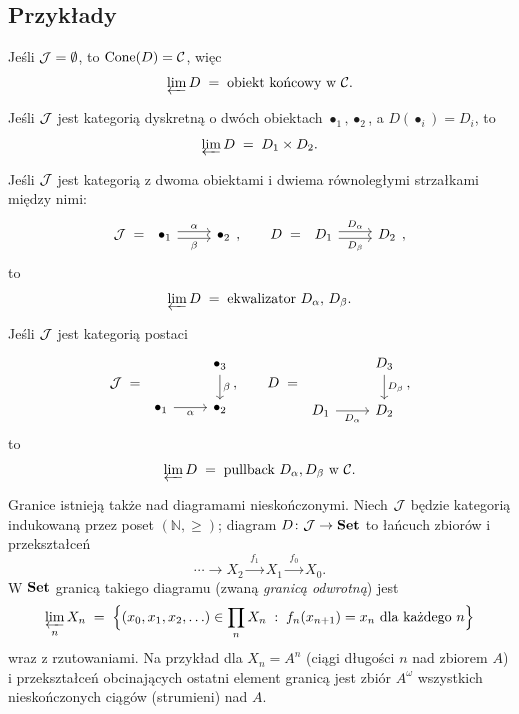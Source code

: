 \subsection*{Przykłady}

\begin{przyklad}
Jeśli $\mathcal{J} = \emptyset$, to $\mathrm{Cone}(D) = \mathcal{C}$, więc
\[
\varprojlim D \;=\; \text{obiekt końcowy w } \mathcal{C}.
\]
\end{przyklad}

\begin{przyklad}
Jeśli $\mathcal{J}$ jest kategorią dyskretną o dwóch obiektach $\bullet_1, \bullet_2$, a $D(\bullet_i) = D_i$, to
\[
\varprojlim D \;=\; D_1 \times D_2.
\]
\end{przyklad}

\begin{przyklad}
Jeśli $\mathcal{J}$ jest kategorią z dwoma obiektami i dwiema równoległymi strzałkami między nimi:
\[
\Jcat \;=\; \begin{tikzcd} \bullet_1 \arrow[r, shift left, "\alpha"] \arrow[r, shift right, "\beta"'] & \bullet_2 \end{tikzcd},
\qquad
D \;=\; \begin{tikzcd} D_1 \arrow[r, shift left, "D_\alpha"] \arrow[r, shift right, "D_\beta"'] & D_2 \end{tikzcd},
\]
to
\[
\varprojlim D \;=\; \text{ekwalizator } D_\alpha,\, D_\beta.
\]
\end{przyklad}

\begin{przyklad}
Jeśli $\mathcal{J}$ jest kategorią postaci
\[
\Jcat \;=\; \begin{tikzcd} & \bullet_3 \arrow[d, "\beta"] \\ \bullet_1 \arrow[r, "\alpha"'] & \bullet_2 \end{tikzcd},
\qquad
D \;=\; \begin{tikzcd} & D_3 \arrow[d, "D_\beta"] \\ D_1 \arrow[r, "D_\alpha"'] & D_2 \end{tikzcd},
\]
to
\[
\varprojlim D \;=\; \text{pullback } D_\alpha, D_\beta \text{ w } \mathcal{C}.
\]
\end{przyklad}

\begin{przyklad}
Granice istnieją także nad diagramami nieskończonymi. Niech $\mathcal{J}$ będzie kategorią indukowaną przez poset $(\mathbb{N}, \ge)$; diagram $D\colon \mathcal{J}\to\mathbf{Set}$ to łańcuch zbiorów i przekształceń
\[
\cdots \longrightarrow X_2 \xrightarrow{\;f_1\;} X_1 \xrightarrow{\;f_0\;} X_0.
\]
W $\mathbf{Set}$ granicą takiego diagramu (zwaną \emph{granicą odwrotną}) jest
\[
\varprojlim_n X_n \;=\; \Bigl\{ (x_0, x_1, x_2, \ldots) \in \prod_n X_n \;:\; f_n(x_{n+1}) = x_n \text{ dla każdego } n \Bigr\}
\]
wraz z rzutowaniami. Na przykład dla $X_n = A^n$ (ciągi długości $n$ nad zbiorem $A$) i przekształceń obcinających ostatni element granicą jest zbiór $A^\omega$ wszystkich nieskończonych ciągów (strumieni) nad $A$.
\end{przyklad}

